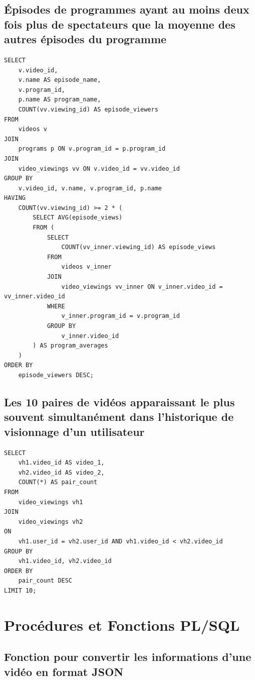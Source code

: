 \documentclass[a4paper,12pt]{article}
\begin{document}
\subsection{Épisodes de programmes ayant au moins deux fois plus de spectateurs que la moyenne des autres épisodes du programme}

\begin{lstlisting}
SELECT 
    v.video_id,
    v.name AS episode_name,
    v.program_id,
    p.name AS program_name,
    COUNT(vv.viewing_id) AS episode_viewers
FROM 
    videos v
JOIN 
    programs p ON v.program_id = p.program_id
JOIN 
    video_viewings vv ON v.video_id = vv.video_id
GROUP BY 
    v.video_id, v.name, v.program_id, p.name
HAVING 
    COUNT(vv.viewing_id) >= 2 * (
        SELECT AVG(episode_views)
        FROM (
            SELECT 
                COUNT(vv_inner.viewing_id) AS episode_views
            FROM 
                videos v_inner
            JOIN 
                video_viewings vv_inner ON v_inner.video_id = vv_inner.video_id
            WHERE 
                v_inner.program_id = v.program_id
            GROUP BY 
                v_inner.video_id
        ) AS program_averages
    )
ORDER BY 
    episode_viewers DESC;
\end{lstlisting}

\subsection{Les 10 paires de vidéos apparaissant le plus souvent simultanément dans l'historique de visionnage d'un utilisateur}

\begin{lstlisting}
SELECT 
    vh1.video_id AS video_1,
    vh2.video_id AS video_2,
    COUNT(*) AS pair_count
FROM 
    video_viewings vh1
JOIN 
    video_viewings vh2 
ON 
    vh1.user_id = vh2.user_id AND vh1.video_id < vh2.video_id
GROUP BY 
    vh1.video_id, vh2.video_id
ORDER BY 
    pair_count DESC
LIMIT 10;
\end{lstlisting}

\section{Procédures et Fonctions PL/SQL}

\subsection{Fonction pour convertir les informations d'une vidéo en format JSON}
\end{document}
